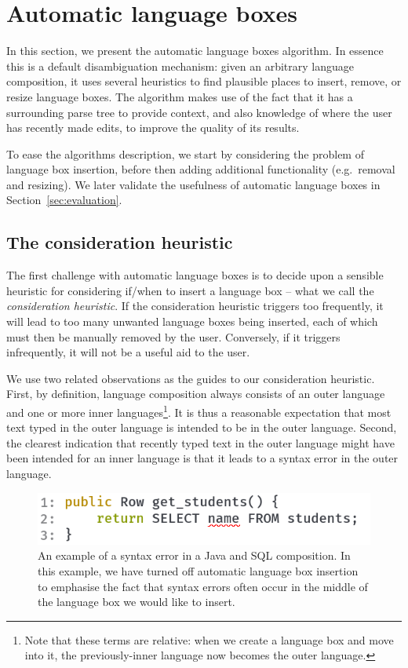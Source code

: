 \documentclass[sigplan,screen]{acmart}\settopmatter{printfolios=true,printccs=false,printacmref=false}
\begin{document}
\section{Automatic language boxes}

In this section, we present the automatic language boxes algorithm. In essence
this is a default disambiguation mechanism: given an arbitrary language
composition, it uses several heuristics to find plausible places to insert,
remove, or resize language boxes. The algorithm makes use of the fact that it
has a surrounding parse tree to provide context, and also knowledge of where
the user has recently made edits, to improve the quality of its results.

To ease the algorithms description, we start by considering the problem of language box
insertion, before then adding additional functionality (e.g.~removal and
resizing). We later validate the usefulness of automatic language boxes in
Section~\ref{sec:evaluation}.


\subsection{The consideration heuristic}

The first challenge with automatic language boxes is to decide upon a sensible
heuristic for considering if/when to insert a language box -- what we call the
\emph{consideration heuristic}. If the consideration heuristic triggers too
frequently, it will lead to too many unwanted language boxes being inserted,
each of which must then be manually removed by the user.
Conversely, if it triggers infrequently, it will not be a useful aid to the user.

We use two related observations as the guides to our consideration heuristic.
First, by definition, language composition always consists of an outer language
and one or more inner languages\footnote{Note that these terms are relative:
when we create a language box and move into it, the previously-inner language
now becomes the outer language.}. It is thus a reasonable expectation that most
text typed in the outer language is intended to be in the outer language.
Second, the clearest indication that recently typed text in the outer language
might have been intended for an inner language is that it leads to a syntax error
in the outer language.

\begin{figure}[tb]
    \includegraphics[width=.40\textwidth]{images/composition_error1.png}
    \caption{An example of a syntax error in a Java and SQL composition. In
      this example, we have turned off automatic language box insertion to
      emphasise the fact that syntax errors often occur in the middle of the
      language box we would like to insert.}
\label{fig:consideration}
\end{figure}
\end{document}
